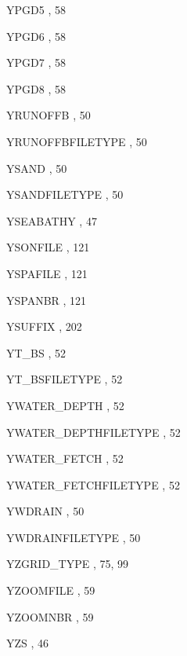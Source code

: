 \begin{theindex}
  \item YPGD5
    \subitem {},  58
  \item YPGD6
    \subitem {},  58
  \item YPGD7
    \subitem {},  58
  \item YPGD8
    \subitem {},  58
  \item YRUNOFFB
    \subitem {},  50
  \item YRUNOFFBFILETYPE
    \subitem {},  50
  \item YSAND
    \subitem {},  50
  \item YSANDFILETYPE
    \subitem {},  50
  \item YSEABATHY
    \subitem {},  47
  \item YSONFILE
    \subitem {},  121
  \item YSPAFILE
    \subitem {},  121
  \item YSPANBR
    \subitem {},  121
  \item YSUFFIX
    \subitem {},  202
  \item YT\_BS
    \subitem {},  52
  \item YT\_BSFILETYPE
    \subitem {},  52
  \item YWATER\_DEPTH
    \subitem {},  52
  \item YWATER\_DEPTHFILETYPE
    \subitem {},  52
  \item YWATER\_FETCH
    \subitem {},  52
  \item YWATER\_FETCHFILETYPE
    \subitem {},  52
  \item YWDRAIN
    \subitem {},  50
  \item YWDRAINFILETYPE
    \subitem {},  50
  \item YZGRID\_TYPE
    \subitem {},  75, 99
  \item YZOOMFILE
    \subitem {},  59
  \item YZOOMNBR
    \subitem {},  59
  \item YZS
    \subitem {},  46


\end{theindex}
